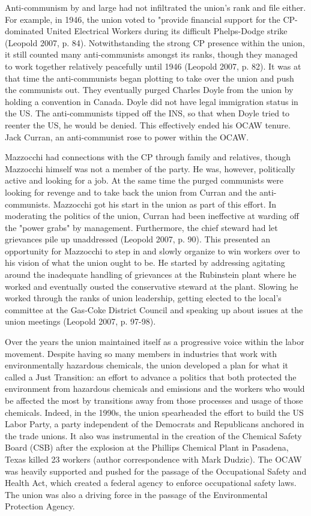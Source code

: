 \documentclass[12pt]{article}
\begin{document}
Anti-communism by and large had not infiltrated the union’s rank and file either. For example, in 1946, the union voted to "provide financial support for the CP-dominated United Electrical Workers during its difficult Phelps-Dodge strike (Leopold 2007, p. 84). Notwithstanding the strong CP presence within the union, it still counted many anti-communists amongst its ranks, though they managed to work together relatively peacefully until 1946 (Leopold 2007, p. 82). It was at that time the anti-communists began plotting to take over the union and push the communists out. They eventually purged Charles Doyle from the union by holding a convention in Canada. Doyle did not have legal immigration status in the US. The anti-communists tipped off the INS, so that when Doyle tried to reenter the US, he would be denied. This effectively ended his OCAW tenure. Jack Curran, an anti-communist rose to power within the OCAW.

Mazzocchi had connections with the CP through family and relatives, though Mazzocchi himself was not a member of the party. He was, however, politically active and looking for a job. At the same time the purged communists were looking for revenge and to take back the union from Curran and the anti-communists. Mazzocchi got his start in the union as part of this effort. In moderating the politics of the union, Curran had been ineffective at warding off the "power grabs" by management. Furthermore, the chief steward had let grievances pile up unaddressed (Leopold 2007, p. 90). This presented an opportunity for Mazzocchi to step in and slowly organize to win workers over to his vision of what the union ought to be. He started by addressing agitating around the inadequate handling of grievances at the Rubinstein plant where he worked and eventually ousted the conservative steward at the plant. Slowing he worked through the ranks of union leadership, getting elected to the local’s committee at the Gas-Coke District Council and speaking up about issues at the union meetings (Leopold 2007, p. 97-98). 

Over the years the union maintained itself as a progressive voice within the labor movement. Despite having so many members in industries that work with environmentally hazardous chemicals, the union developed a plan for what it called a Just Transition: an effort to advance a politics that both protected the environment from hazardous chemicals and emissions and the workers who would be affected the most by transitions away from those processes and usage of those chemicals. Indeed, in the 1990s, the union  spearheaded the effort to build the US Labor Party, a party independent of the Democrats and Republicans anchored in the trade unions. It also was instrumental in the creation of the Chemical Safety Board (CSB) after the explosion at the Phillips Chemical Plant in Pasadena, Texas killed 23 workers (author correspondence with Mark Dudzic). The OCAW was heavily supported and pushed for the passage of the Occupational Safety and Health Act, which created a federal agency to enforce occupational safety laws. The union was also a driving force in the passage of the Environmental Protection Agency.
\end{document}
